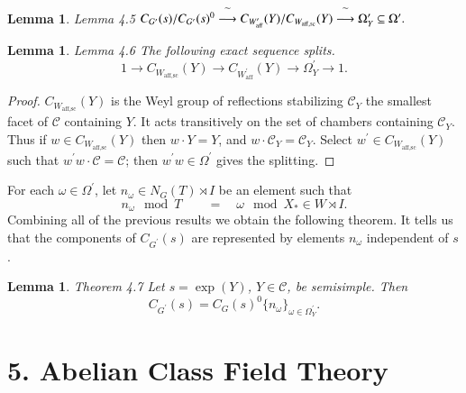\documentclass[11pt]{amsart}
\theoremstyle{plain}
\newtheorem{lemma}[theorem]{Lemma}
\theoremstyle{definition}
\def\Waff{W_{\operatorname{aff}}}
\def\Waffsc{W_{\operatorname{aff,sc}}}
\def\map{\buildrel{}\widetilde{}\over\longrightarrow}
\def\CurlyC{{\mathcal C}}
\begin{document}
\begin{lemma}{Lemma 4.5}
$
C_{G^\prime}(s)/C_{G^\prime}(s)^0
\map C_{\Waff^\prime}(Y)/C_{\Waffsc}(Y)
\map\Omega_Y^\prime\subseteq\Omega^\prime.
$
\end{lemma}

\begin{lemma}{Lemma 4.6} The following exact sequence splits.
$$
1\to C_{\Waffsc}(Y)\to
C_{\Waff^\prime}(Y)
\to \Omega_Y^\prime\to 1.
$$
\end{lemma}

\begin{proof}  $C_{\Waffsc}(Y)$ is
the Weyl group of reflections stabilizing
$\CurlyC_Y$ the smallest facet of $\CurlyC$ containing $Y$.
It acts transitively on the set of chambers 
containing $\CurlyC_Y$.  Thus if $w\in C_{\Waffsc}(Y)$
then $w\cdot Y=Y$, and $w\cdot \CurlyC_Y = \CurlyC_Y$.
Select $w^\prime\in C_{\Waffsc}(Y)$ such that
$w^\prime w\cdot \CurlyC = \CurlyC$; then
$w^\prime w\in\Omega^\prime$ gives the 
splitting.  
\end{proof}



For each $\omega\in \Omega^\prime$, let
$n_\omega\in N_G(T)\rtimes I$ be an element such that
$$
n_\omega\mod T \qquad=\quad\omega\mod X_*\in W\rtimes I.
$$
Combining all of the previous results we obtain the following theorem.  It
tells us that the components of $C_{G^\prime}(s)$ are represented by elements
$n_\omega$ independent of $s$.

\begin{lemma}{Theorem 4.7} Let $s=\exp(Y)$, $Y\in \CurlyC$, be 
semisimple.  
Then
$$
C_{G^\prime}(s) = C_G(s)^0\{n_\omega\}_{\omega\in\Omega_Y^\prime}.
$$
\end{lemma}

\section{5.  Abelian Class Field Theory}
\end{document}
